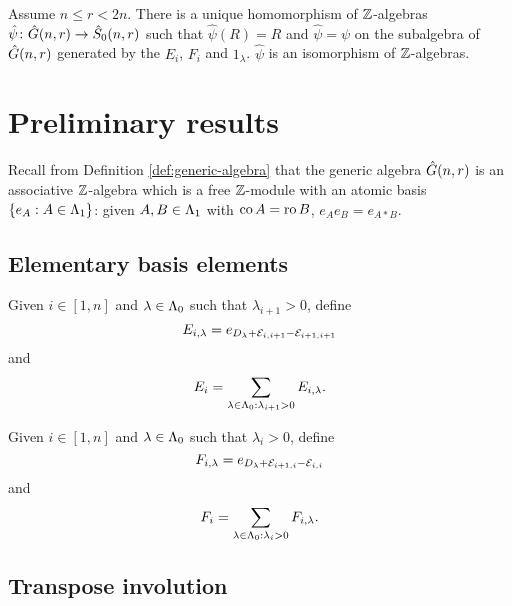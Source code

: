 \documentclass[a4paper, 11pt]{report}
\begin{document}
\begin{theorem}
Assume $n\le r< 2n$. There is a unique homomorphism of $\mathbb{Z}$-algebras $\hat{\psi}\colon\hat{G}(n,r)\to\hat{S}_0(n,r)$ such that $\hat{\psi}(R)=R$ and $\hat{\psi}=\psi$ on the subalgebra of $\hat{G}(n,r)$ generated by the $E_i$, $F_i$ and $1_\lambda$. $\hat{\psi}$ is an isomorphism of $\mathbb{Z}$-algebras.
\end{theorem}

\section{Preliminary results}

Recall from Definition \ref{def:generic-algebra} that the generic algebra $\hat{G}(n,r)$ is an associative $\mathbb{Z}$-algebra which is a free $\mathbb{Z}$-module with an atomic basis $\{e_A:A\in{\Lambda_1}\}$: given $A,B\in{\Lambda_1}$ with $\operatorname{co}{A}=\operatorname{ro}{B}$, $e_Ae_B = e_{A\ast B}$.

\subsection{Elementary basis elements}

Given $i\in[1,n]$ and $\lambda\in{\Lambda_0}$ such that $\lambda_{i+1}>0$, define
\begin{equation*}
E_{i,\lambda} = e_{D_\lambda + \mathcal{E}_{i,i+1} - \mathcal{E}_{i+1,i+1}}
\end{equation*}
and
\begin{equation*}
E_i = \sum_{\lambda\in{\Lambda_0}:\lambda_{i+1}>0} E_{i,\lambda}.
\end{equation*}

Given $i\in[1,n]$ and $\lambda\in{\Lambda_0}$ such that $\lambda_i>0$, define
\begin{equation*}
F_{i,\lambda} = e_{D_\lambda + \mathcal{E}_{i+1,i} - \mathcal{E}_{i,i}}
\end{equation*}
and
\begin{equation*}
F_i = \sum_{\lambda\in{\Lambda_0}:\lambda_i>0} F_{i,\lambda}.
\end{equation*}

\subsection{Transpose involution}
\end{document}
